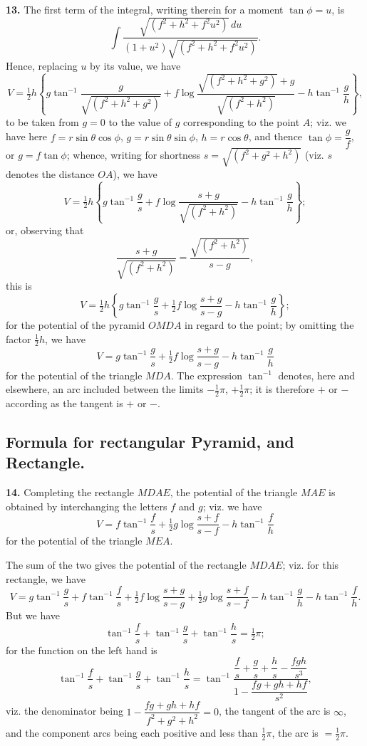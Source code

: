 \documentclass[11pt,a4paper]{article}
\begin{document}
\newpage
\noindent\textbf{13.}\quad
The first term of the integral, writing therein for a moment $\tan\phi=u$,
is
\[
\int \frac{\sqrt{(f^2+h^2+f^2u^2)}\,du}{(1+u^2)\sqrt{(f^2+h^2+f^2u^2)}}.
\]
Hence, replacing $u$ by its value, we have
\[
V = \tfrac{1}{2}h
    \left\{
      g\tan^{-1}\frac{g}{\sqrt{(f^2+h^2+g^2)}}
      + f\log\frac{\sqrt{(f^2+h^2+g^2)}+g}{\sqrt{(f^2+h^2)}}
      - h\tan^{-1}\frac{g}{h}
    \right\},
\]
to be taken from $g=0$ to the value of $g$ corresponding to the point $A$;
viz. we have here $f=r\sin\theta\cos\phi$, $g=r\sin\theta\sin\phi$,
$h=r\cos\theta$, and thence $\tan\phi=\dfrac{g}{f}$, or $g=f\tan\phi$;
whence, writing for shortness $s=\sqrt{(f^2+g^2+h^2)}$ (viz. $s$ denotes the
distance $OA$), we have
\[
V = \tfrac{1}{2}h
    \left\{
      g\tan^{-1}\frac{g}{s} + f\log\frac{s+g}{\sqrt{(f^2+h^2)}}
      - h\tan^{-1}\frac{g}{h}
    \right\};
\]
or, observing that
\[
\frac{s+g}{\sqrt{(f^2+h^2)}} = \frac{\sqrt{(f^2+h^2)}}{s-g},
\]
this is
\[
V = \tfrac{1}{2}h
    \left\{
      g\tan^{-1}\frac{g}{s} + \tfrac{1}{2}f\log\frac{s+g}{s-g}
      - h\tan^{-1}\frac{g}{h}
    \right\};
\]
for the potential of the pyramid $OMDA$ in regard to the point; by omitting
the factor $\tfrac{1}{2}h$, we have
\[
V = g\tan^{-1}\frac{g}{s} + \tfrac{1}{2}f\log\frac{s+g}{s-g}
  - h\tan^{-1}\frac{g}{h}
\]
for the potential of the triangle $MDA$. The expression $\tan^{-1}$ denotes,
here and elsewhere, an arc included between the limits $-\tfrac{1}{2}\pi$,
$+\tfrac{1}{2}\pi$; it is therefore $+$ or $-$ according as the tangent is
$+$ or $-$.

\newpage
\subsection*{Formula for rectangular Pyramid, and Rectangle.}

\smallskip\noindent\textbf{14.}\quad
Completing the rectangle $MDAE$, the potential of the triangle $MAE$ is
obtained by interchanging the letters $f$ and $g$; viz. we have
\[
V = f\tan^{-1}\frac{f}{s} + \tfrac{1}{2}g\log\frac{s+f}{s-f}
  - h\tan^{-1}\frac{f}{h}
\]
for the potential of the triangle $MEA$.

The sum of the two gives the potential of the rectangle $MDAE$; viz. for
this rectangle, we have
\[
V = g\tan^{-1}\frac{g}{s} + f\tan^{-1}\frac{f}{s}
  + \tfrac{1}{2}f\log\frac{s+g}{s-g} + \tfrac{1}{2}g\log\frac{s+f}{s-f}
  - h\tan^{-1}\frac{g}{h} - h\tan^{-1}\frac{f}{h}.
\]
But we have
\[
\tan^{-1}\frac{f}{s} + \tan^{-1}\frac{g}{s} + \tan^{-1}\frac{h}{s}
= \tfrac{1}{2}\pi;
\]
for the function on the left hand is
\[
\tan^{-1}\frac{f}{s} + \tan^{-1}\frac{g}{s} + \tan^{-1}\frac{h}{s}
= \tan^{-1}
  \frac{\dfrac{f}{s}+\dfrac{g}{s}+\dfrac{h}{s}
        -\dfrac{fgh}{s^3}}
       {1-\dfrac{fg+gh+hf}{s^2}},
\]
viz. the denominator being $1-\dfrac{fg+gh+hf}{f^2+g^2+h^2}=0$, the tangent of
the arc is $\infty$, and the component arcs being each positive and less than
$\tfrac{1}{2}\pi$, the arc is $=\tfrac{1}{2}\pi$.
\end{document}
